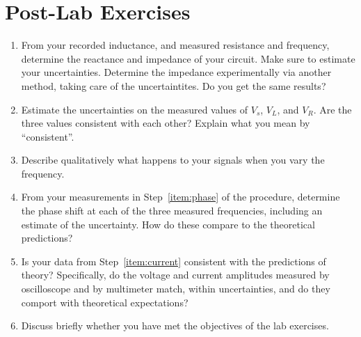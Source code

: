 \documentclass[12pt]{article}
\begin{document}
\newpage

\section*{Post-Lab Exercises}

\begin{enumerate}
\item From your recorded inductance, and measured resistance and
  frequency, determine the reactance and impedance of your circuit.
  Make sure to estimate your uncertainties.  Determine the impedance
  experimentally via another method, taking care of the
  uncertaintites.%
  Do you get the same results?
\item Estimate the uncertainties on the measured values of $V_s$,
  $V_L$, and $V_R$.  Are the three values consistent with each other?
  Explain what you mean by ``consistent''.
\item Describe qualitatively what happens to your signals when you
  vary the frequency.
\item From your measurements in Step~\ref{item:phase} of the
  procedure, determine the phase shift at each of the three measured
  frequencies, including an estimate of the uncertainty.  How do these
  compare to the theoretical predictions? 
\item Is your data from Step~\ref{item:current} consistent with the
  predictions of theory?  Specifically, do the voltage and current
  amplitudes measured by oscilloscope and by multimeter match, within
  uncertainties, and do they comport with theoretical expectations?
\item Discuss briefly whether you have met the objectives of the lab
  exercises.
\end{enumerate}
\end{document}
